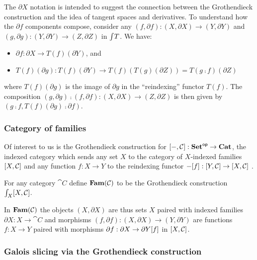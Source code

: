 \noindent The $\partial X$ notation is intended to suggest the connection between the Grothendieck
construction and the idea of tangent spaces and derivatives. To understand how the $\partial f$ components
compose, consider any $(f, \partial f): (X, \partial X) \to (Y, \partial Y)$ and $(g, \partial g): (Y,
\partial Y) \to (Z, \partial Z)$ in $\int_{}T$. We have:

\begin{itemize}
\item $\partial f: \partial X \to T(f)(\partial Y)$, and
\item $T(f)(\partial g): T(f)(\partial Y) \to T(f)(T(g)(\partial Z)) = T(g \comp f)(\partial Z)$
\end{itemize}

\noindent where $T(f)(\partial g)$ is the image of $\partial g$ in the ``reindexing'' functor $T(f)$. The
composition $(g, \partial g) \comp (f, \partial f): (X, \partial X) \to (Z, \partial Z)$ is then given by $(g
\comp f, T(f)(\partial g) \comp \partial f)$.

\subsubsection{Category of families}
\label{sec:Fam}

Of interest to us is the Grothendieck construction for $[-,\mathcal{C}]: \mathbf{Set}^{\mathsf{op}} \to \mathbf{Cat}$, the indexed
category which sends any set $X$ to the category of $X$-indexed families $[X,\mathcal{C}]$ and any function
$f: X \to Y$ to the reindexing functor $-[f]: [Y,\mathcal{C}] \to [X,\mathcal{C}]$ .

\begin{definition}
\label{def:Fam}
For any category $\cat{C}$ define $\mathbf{Fam}(\mathcal{C})$ to be the Grothendieck construction
$\int_{X}[X,\mathcal{C}]$.
\end{definition}

\noindent In $\mathbf{Fam}(\mathcal{C})$ the objects $(X, \partial X)$ are thus sets $X$ paired with indexed families
$\partial X: X \to \cat{C}$ and morphisms $(f, \partial f): (X, \partial X) \to (Y, \partial Y)$ are functions
$f: X \to Y$ paired with morphisms $\partial f: \partial X \to \partial Y[f]$ in
$[X,\mathcal{C}]$.

\subsubsection{Galois slicing via the Grothendieck construction}

